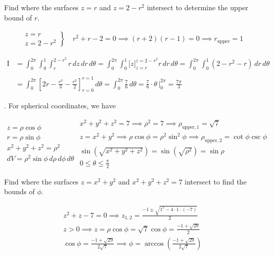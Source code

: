 \documentclass{article}
\begin{document}
\hfill

\noindent Find where the surfaces $z=r$ and $z=2-r^2$ intersect to determine the upper bound of $r$.

\begin{align*}\left.\begin{array}{c}
z=r\\
z=2-r^2
\end{array}\right\}\quad r^2+r-2=0\implies (r+2)(r-1)=0\implies r_{\text{upper}}=1\end{align*}

\newpage

\begin{align*}\mathrm{I}&=\int_0^{2\pi}\int_0^1\int_{r}^{2-r^2}r\,dz\,dr\,d\theta=\int_0^{2\pi}\int_0^1\bigg[z\bigg]_{z=r}^{z=2-r^2}r\,dr\,d\theta=\int_0^{2\pi}\int_0^1\left(2-r^2-r\right)\,dr\,d\theta\\\\&=\int_0^{2\pi}\left[2r-\frac{r^3}3-\frac{r^2}2\right]_{r=0}^{r=1}\,d\theta=\int_0^{2\pi}\frac76\,d\theta=\frac76\cdot\theta\,\bigg|_0^{2\pi}=\boxed{\frac{7\pi}3}\end{align*}

\hfill

. For spherical coordinates, we have

\[
\left.\begin{array}{c}
z=\rho\cos\phi\\
r=\rho\sin\phi\\
x^2+y^2+z^2=\rho^2\\
dV=\rho^2\sin\phi\,d\rho\,d\phi\,d\theta
\end{array}\right.\begin{array}{c}
x^2+y^2+z^2=7\implies\rho^2=7\implies\rho_{\text{upper},1}=\sqrt7\\
z=x^2+y^2\implies\rho\cos\phi=\rho^2\sin^2\phi\implies\rho_{\text{upper},2}=\cot\phi\csc\phi\\[1em]
\sin\left(\sqrt{x^2+y^2+z^2}\right)=\sin\left(\sqrt{\rho^2}\right)=\sin\rho\\[1em]
\displaystyle0\leq\theta\leq\frac\pi2
\end{array}\]

\hfill

\noindent Find where the surfaces $z=x^2+y^2$ and $x^2+y^2+z^2=7$ intersect to find the bounds of $\phi$.

\[\begin{array}{c}\displaystyle z^2+z-7=0\implies z_{1,2}=\frac{-1\pm\sqrt{1^2-4\cdot1\cdot(-7)}}2\\[1em]\displaystyle z>0\implies z=\rho\cos\phi=\sqrt7\cos\phi=\frac{-1+\sqrt{29}}{2}\\[1em]\displaystyle\cos\phi=\frac{-1+\sqrt{29}}{2\sqrt7}\implies\phi=\arccos\left(\frac{-1+\sqrt{29}}{2\sqrt7}\right)\end{array}\]
\end{document}
